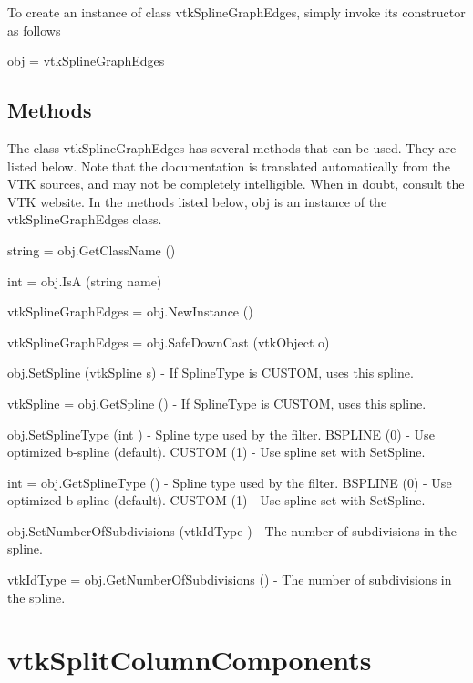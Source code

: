 To create an instance of class vtk\-Spline\-Graph\-Edges, simply invoke its constructor as follows \begin{DoxyVerb}  obj = vtkSplineGraphEdges
\end{DoxyVerb}
 \hypertarget{vtkwidgets_vtkxyplotwidget_Methods}{}\subsection{Methods}\label{vtkwidgets_vtkxyplotwidget_Methods}
The class vtk\-Spline\-Graph\-Edges has several methods that can be used. They are listed below. Note that the documentation is translated automatically from the V\-T\-K sources, and may not be completely intelligible. When in doubt, consult the V\-T\-K website. In the methods listed below, {\ttfamily obj} is an instance of the vtk\-Spline\-Graph\-Edges class. 
\begin{DoxyItemize}
\item {\ttfamily string = obj.\-Get\-Class\-Name ()}  
\item {\ttfamily int = obj.\-Is\-A (string name)}  
\item {\ttfamily vtk\-Spline\-Graph\-Edges = obj.\-New\-Instance ()}  
\item {\ttfamily vtk\-Spline\-Graph\-Edges = obj.\-Safe\-Down\-Cast (vtk\-Object o)}  
\item {\ttfamily obj.\-Set\-Spline (vtk\-Spline s)} -\/ If Spline\-Type is C\-U\-S\-T\-O\-M, uses this spline.  
\item {\ttfamily vtk\-Spline = obj.\-Get\-Spline ()} -\/ If Spline\-Type is C\-U\-S\-T\-O\-M, uses this spline.  
\item {\ttfamily obj.\-Set\-Spline\-Type (int )} -\/ Spline type used by the filter. B\-S\-P\-L\-I\-N\-E (0) -\/ Use optimized b-\/spline (default). C\-U\-S\-T\-O\-M (1) -\/ Use spline set with Set\-Spline.  
\item {\ttfamily int = obj.\-Get\-Spline\-Type ()} -\/ Spline type used by the filter. B\-S\-P\-L\-I\-N\-E (0) -\/ Use optimized b-\/spline (default). C\-U\-S\-T\-O\-M (1) -\/ Use spline set with Set\-Spline.  
\item {\ttfamily obj.\-Set\-Number\-Of\-Subdivisions (vtk\-Id\-Type )} -\/ The number of subdivisions in the spline.  
\item {\ttfamily vtk\-Id\-Type = obj.\-Get\-Number\-Of\-Subdivisions ()} -\/ The number of subdivisions in the spline.  
\end{DoxyItemize}\hypertarget{vtkinfovis_vtksplitcolumncomponents}{}\section{vtk\-Split\-Column\-Components}\label{vtkinfovis_vtksplitcolumncomponents}
